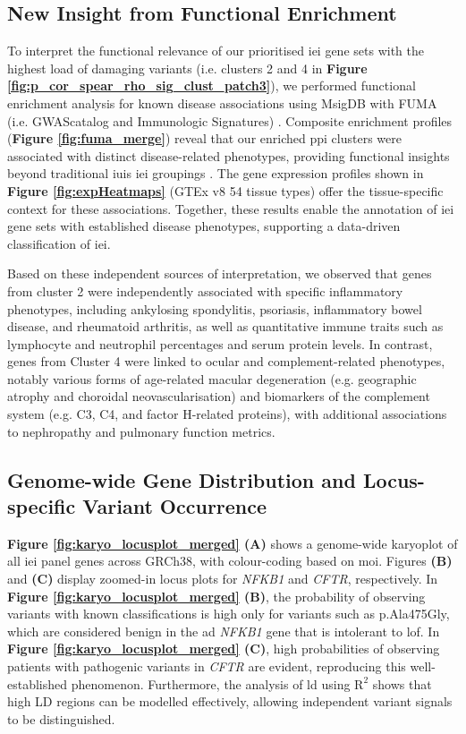\subsection{New Insight from Functional Enrichment}
To interpret the functional relevance of our prioritised \ac{iei} gene sets with the highest load of damaging variants (i.e. clusters 2 and 4 in \textbf{Figure \ref{fig:p_cor_spear_rho_sig_clust_patch3}}), we performed functional enrichment analysis for known disease associations using MsigDB with FUMA (i.e. GWAScatalog and Immunologic Signatures) \cite{watanabe_functional_2017}. Composite enrichment profiles (\textbf{Figure \ref{fig:fuma_merge}}) reveal that our enriched \ac{ppi} clusters were associated with distinct disease-related phenotypes, providing functional insights beyond traditional \ac{iuis} \ac{iei} groupings \cite{tangye_human_2022}. The gene expression profiles shown in \textbf{Figure \ref{fig:expHeatmaps}} (GTEx v8 54 tissue types) offer the tissue-specific context for these associations. Together, these results enable the annotation of \ac{iei} gene sets with established disease phenotypes, supporting a data-driven classification of \ac{iei}.

Based on these independent sources of interpretation, we observed that genes from cluster 2 were independently associated with specific inflammatory phenotypes, including ankylosing spondylitis, psoriasis, inflammatory bowel disease, and rheumatoid arthritis, as well as quantitative immune traits such as lymphocyte and neutrophil percentages and serum protein levels.
In contrast, genes from Cluster 4 were linked to ocular and complement-related phenotypes, notably various forms of age-related macular degeneration (e.g. geographic atrophy and choroidal neovascularisation) and biomarkers of the complement system (e.g. C3, C4, and factor H-related proteins), with additional associations to nephropathy and pulmonary function metrics.

\subsection{Genome-wide Gene Distribution and Locus-specific Variant Occurrence}

\textbf{Figure \ref{fig:karyo_locusplot_merged} (A)} shows a genome-wide karyoplot of all \ac{iei} panel genes across GRCh38, with colour-coding based on \ac{moi}. Figures \textbf{(B)} and \textbf{(C)} display zoomed-in locus plots for \textit{NFKB1} and \textit{CFTR}, respectively. 
In \textbf{Figure \ref{fig:karyo_locusplot_merged} (B)}, the probability of observing variants with known classifications is high only for variants such as p.Ala475Gly, which are considered benign in the \ac{ad} \textit{NFKB1} gene that is intolerant to \ac{lof}. 
In \textbf{Figure \ref{fig:karyo_locusplot_merged} (C)}, high probabilities of observing patients with pathogenic variants in \textit{CFTR} are evident, reproducing this well-established phenomenon. Furthermore, the analysis of \ac{ld} using $\text{R}^2$ shows that high LD regions can be modelled effectively, allowing independent variant signals to be distinguished.

